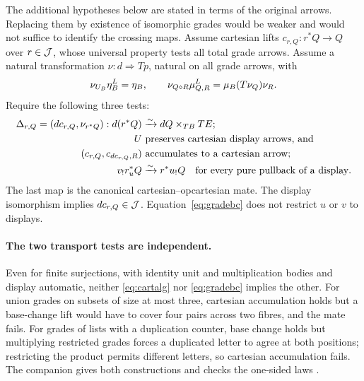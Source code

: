 \documentclass[11pt]{article}
\numberwithin{equation}{section}
\theoremstyle{definition}\newtheorem{definition}[theorem]{Definition}
\newcommand{\iso}{\xrightarrow{\sim}}\newcommand{\ea}{e}\newcommand{\un}{\mathbf1}\newcommand{\Tt}{\overline T}
\begin{document}
The additional hypotheses below are stated in terms of the original
arrows. Replacing them by existence of isomorphic grades would be weaker
and would not suffice to identify the crossing maps.
Assume cartesian lifts $c_{r,Q}:r^*Q\to Q$ over $r\in\mathcal J$, whose
universal property tests all total grade arrows. Assume a natural
transformation $\nu:d\Rightarrow Tp$, natural on all grade arrows, with
\begin{equation}\label{eq:nulaws}
 \nu_{U_B}\eta^L_B=\eta_B,
 \qquad \nu_{Q\mathbin{\diamond} R}\mu^L_{Q,R}
                   =\mu_B(T\nu_Q)\nu_R.
\end{equation}
Require the following three tests:
\begin{align}
 \Delta_{r,Q}=(dc_{r,Q},\nu_{r^*Q}):d(r^*Q)
       &\iso dQ\times_{TB}TE;\label{eq:display}\\
 U&\text{ preserves cartesian display arrows, and}\notag\\
 (c_{r,Q},c_{dc_{r,Q},R})
       &\text{ accumulates to a cartesian arrow};\label{eq:cartalg}\\
 v_!r_u^*Q&\iso r^*u_!Q
       \quad\text{for every pure pullback of a display}.\label{eq:gradebc}
\end{align}
The last map is the canonical cartesian--opcartesian mate. The display
isomorphism implies $dc_{r,Q}\in\mathcal J$. Equation~\eqref{eq:gradebc} does
not restrict $u$ or $v$ to displays.

\paragraph{The two transport tests are independent.}
Even for finite surjections, with identity unit and multiplication bodies
and display automatic, neither \eqref{eq:cartalg} nor \eqref{eq:gradebc} implies the
other. For union grades on subsets of size at most three, cartesian
accumulation holds but a base-change lift would have to cover four
pairs across two fibres, and the mate fails. For grades of lists with
a duplication counter, base change holds but multiplying restricted
grades forces a duplicated letter to agree at both positions; restricting
the product permits different letters, so cartesian accumulation fails.
The companion gives both constructions and checks the one-sided laws
\cite{TransportIndependence}.
\end{document}
